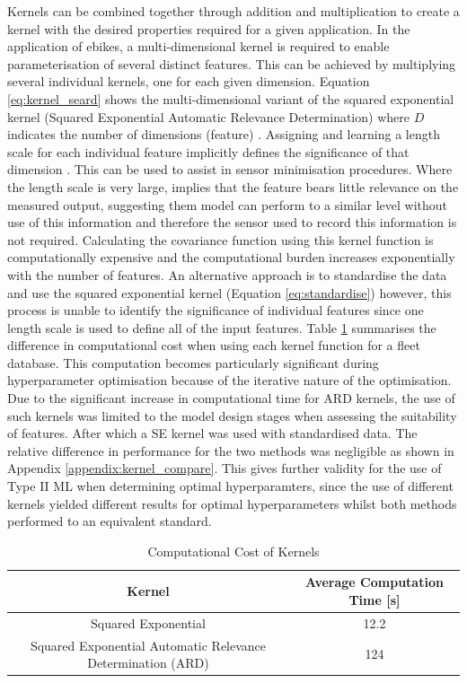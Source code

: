 \documentclass[a4paper, 10pt]{article}
\numberwithin{equation}{section}
\begin{document}
Kernels can be combined together through addition and multiplication to create a kernel with the desired properties required for a given application. In the application of ebikes, a multi-dimensional kernel is required to enable parameterisation of several distinct features. This can be achieved by multiplying several individual kernels, one for each given dimension. Equation \ref{eq:kernel_seard} shows the multi-dimensional variant of the squared exponential kernel (Squared Exponential Automatic Relevance Determination) where $D$ indicates the number of dimensions (feature) \cite{duvenaud}. Assigning and learning a length scale for each individual feature implicitly defines the significance of that dimension \cite{neal_1995}. This can be used to assist in sensor minimisation procedures. Where the length scale is very large, implies that the feature bears little relevance on the measured output, suggesting them model can perform to a similar level without use of this information and therefore the sensor used to record this information is not required. Calculating the covariance function using this kernel function is computationally expensive and the computational burden increases exponentially with the number of features. An alternative approach is to standardise the data and use the squared exponential kernel (Equation \ref{eq:standardise}) however, this process is unable to identify the significance of individual features since one length scale is used to define all of the input features. Table \ref{tab:kernel_computation} summarises the difference in computational cost when using each kernel function for a fleet database. This computation becomes particularly significant during hyperparameter optimisation because of the iterative nature of the optimisation. Due to the significant increase in computational time for ARD kernels, the use of such kernels was limited to the model design stages when assessing the suitability of features. After which a SE kernel was used with standardised data. The relative difference in performance for the two methods was negligible as shown in Appendix \ref{appendix:kernel_compare}. This gives further validity for the use of Type II ML when determining optimal hyperparamters, since the use of different kernels yielded different results for optimal hyperparameters whilst both methods performed to an equivalent standard.


\begin{table}[]
    \centering
    \begin{tabular}{|c|c|} \hline
    
        Kernel & Average Computation Time [s]  \\ \hline
        Squared Exponential  & 12.2  \\ \hline
        Squared Exponential Automatic Relevance Determination (ARD)  & 124  \\ \hline
    \end{tabular}
    \caption{Computational Cost of Kernels}
    \label{tab:kernel_computation}
\end{table}
\end{document}
